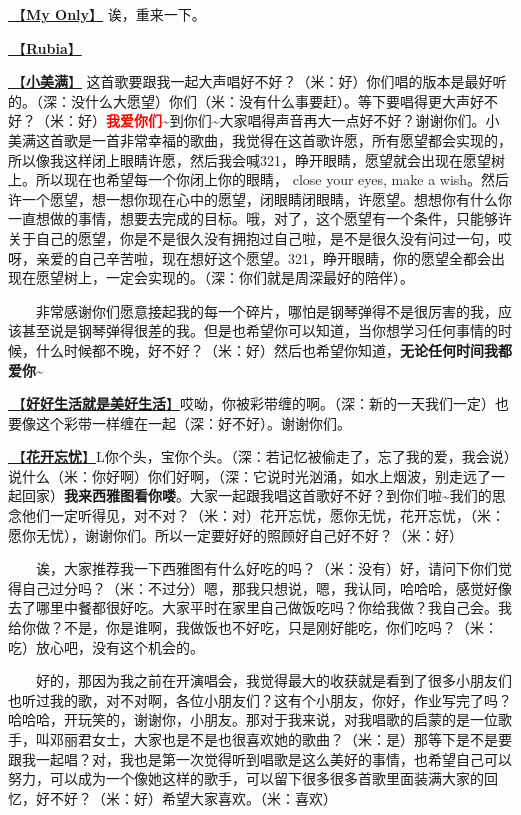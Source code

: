 \documentclass[]{ctexbook}
\begin{document}
\hyperref[my-only]{🎵【\textbf{My Only}】} 诶，重来一下。

\hyperref[rubia]{🎵【\textbf{Rubia}】}

\hyperref[happy-ending]{🎵【\textbf{小美满}】} 这首歌要跟我一起大声唱好不好？（米：好）你们唱的版本是最好听的。（深：没什么大愿望）你们（米：没有什么事要赶）。等下要唱得更大声好不好？（米：好）\textbf{\textcolor{red}{我爱你们}}\textasciitilde 到你们\textasciitilde 大家唱得声音再大一点好不好？谢谢你们。小美满这首歌是一首非常幸福的歌曲，我觉得在这首歌许愿，所有愿望都会实现的，所以像我这样闭上眼睛许愿，然后我会喊321，睁开眼睛，愿望就会出现在愿望树上。所以现在也希望每一个你闭上你的眼睛， close your eyes, make a wish。然后许一个愿望，想一想你现在心中的愿望，闭眼睛闭眼睛，许愿望。想想你有什么你一直想做的事情，想要去完成的目标。哦，对了，这个愿望有一个条件，只能够许关于自己的愿望，你是不是很久没有拥抱过自己啦，是不是很久没有问过一句，哎呀，亲爱的自己辛苦啦，现在想好这个愿望。321，睁开眼睛，你的愿望全都会出现在愿望树上，一定会实现的。（深：你们就是周深最好的陪伴）。

  非常感谢你们愿意接起我的每一个碎片，哪怕是钢琴弹得不是很厉害的我，应该甚至说是钢琴弹得很差的我。但是也希望你可以知道，当你想学习任何事情的时候，什么时候都不晚，好不好？（米：好）然后也希望你知道，\textbf{无论任何时间我都爱你\textasciitilde{}}

\hyperref[live-happy-life-happy]{🎵【\textbf{好好生活就是美好生活}】}哎呦，你被彩带缠的啊。（深：新的一天我们一定）也要像这个彩带一样缠在一起（深：好不好）。谢谢你们。

\hyperref[no-worries]{🎵【\textbf{花开忘忧}】}L你个头，宝你个头。（深：若记忆被偷走了，忘了我的爱，我会说）说什么（米：你好啊）你们好啊，（深：它说时光汹涌，如水上烟波，别走远了一起回家）\textbf{我来西雅图看你喽}。大家一起跟我唱这首歌好不好？到你们啦\textasciitilde 我们的思念他们一定听得见，对不对？（米：对）花开忘忧，愿你无忧，花开忘忧，（米：愿你无忧），谢谢你们。所以一定要好好的照顾好自己好不好？（米：好）

  诶，大家推荐我一下西雅图有什么好吃的吗？（米：没有）好，请问下你们觉得自己过分吗？（米：不过分）嗯，那我只想说，嗯，我认同，哈哈哈，感觉好像去了哪里中餐都很好吃。大家平时在家里自己做饭吃吗？你给我做？我自己会。我给你做？不是，你是谁啊，我做饭也不好吃，只是刚好能吃，你们吃吗？（米：吃）放心吧，没有这个机会的。

  好的，那因为我之前在开演唱会，我觉得最大的收获就是看到了很多小朋友们也听过我的歌，对不对啊，各位小朋友们？这有个小朋友，你好，作业写完了吗？哈哈哈，开玩笑的，谢谢你，小朋友。那对于我来说，对我唱歌的启蒙的是一位歌手，叫邓丽君女士，大家也是不是也很喜欢她的歌曲？（米：是）那等下是不是要跟我一起唱？对，我也是第一次觉得听到唱歌是这么美好的事情，也希望自己可以努力，可以成为一个像她这样的歌手，可以留下很多很多首歌里面装满大家的回忆，好不好？（米：好）希望大家喜欢。（米：喜欢）
\end{document}
